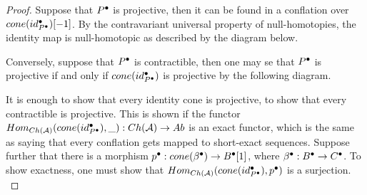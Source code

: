     \begin{proof}
        Suppose that $P^{\bullet}$ is projective, then it can be found in a conflation over $cone(id_{P^{\bullet}}^{\bullet})[-1]$. By the contravariant universal property of null-homotopies, the identity map is null-homotopic as described by the diagram below.
        \begin{center}
        \end{center}

        Conversely, suppose that $P^{\bullet}$ is contractible, then one may se that $P^{\bullet}$ is projective if and only if $cone(id_{P^{\bullet}}^{\bullet})$ is projective by the following diagram.

        \begin{center}
        \end{center}
        
        It is enough to show that every identity cone is projective, to show that every contractible is projective. This is shown if the functor $Hom_{Ch(\mathcal{A})}(cone(id_{P^{\bullet}}^{\bullet}),\_):Ch(\mathcal{A})\rightarrow Ab$ is an exact functor, which is the same as saying that every conflation gets mapped to short-exact sequences. Suppose further that there is a morphism $p^{\bullet}:cone(\beta^{\bullet})\rightarrow B^{\bullet}[1]$, where $\beta^{\bullet}:B^{\bullet}\rightarrow C^{\bullet}$. To show exactness, one must show that $Hom_{Ch(\mathcal{A})}(cone(id_{P^{\bullet}}^{\bullet}),p^{\bullet})$ is a surjection. \\


\end{proof}
